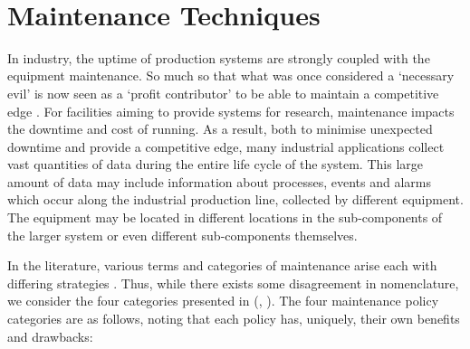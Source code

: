 \documentclass[10pt,oneside]{report}
\renewcommand{\citet}[1]{\citeauthor{#1}, \citeyear{#1}}
\begin{document}
\textbf{}\\


\section{Maintenance Techniques}\label{sec:maintenanceTechniques}
In industry, the uptime of production systems are strongly coupled with the equipment maintenance. So much so that what was once considered a `necessary evil' is now seen as a `profit contributor' to be able to maintain a competitive edge \cite{waeyenbergh2002framework, faccio2014industrial}. For facilities aiming to provide systems for research, maintenance impacts the downtime and cost of running. As a result, both to minimise unexpected downtime and provide a competitive edge, many industrial applications collect vast quantities of data during the entire life cycle of the system. This large amount of data may include information about processes, events and alarms \cite{carvalho2019systematic} which occur along the industrial production line, collected by different equipment. The equipment may be located in different locations in the sub-components of the larger system or even different sub-components themselves. 

In the literature, various terms and categories of maintenance arise each with differing strategies \cite{susto2012predictive, mobley2002introduction, susto2016dealing}. Thus, while there exists some disagreement in nomenclature, we consider the four categories presented in (\citet{susto2012predictive}). The four maintenance policy categories are as follows, noting that each policy has, uniquely, their own benefits and drawbacks:
\end{document}
